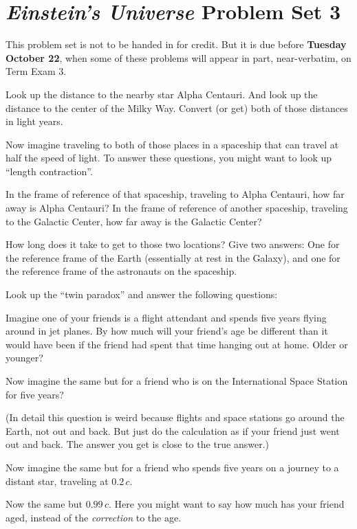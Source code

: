 \documentclass[12pt, letterpaper]{article}
\begin{document}
\section*{\textsl{Einstein's Universe} Problem Set 3}

This problem set is not to be handed in for credit. But it is due
before \textbf{Tuesday October 22}, when some of these problems
will appear in part, near-verbatim, on Term Exam 3.

\begin{problem}
Look up the distance to the nearby star Alpha Centauri. And look up the
distance to the center of the Milky Way. Convert (or get) both of those
distances in light years.

Now imagine traveling to both of those places in a spaceship that can
travel at half the speed of light. To answer these questions, you
might want to look up ``length contraction''.

In the frame of reference of that spaceship, traveling to Alpha
Centauri, how far away is Alpha Centauri? In the frame of reference of
another spaceship, traveling to the Galactic Center, how far away is
the Galactic Center?

How long does it take to get to those two locations? Give two answers:
One for the reference frame of the Earth (essentially at rest in the
Galaxy), and one for the reference frame of the astronauts on the
spaceship.
\end{problem}

\begin{problem}
Look up the ``twin paradox'' and answer the following questions:

Imagine one of your friends is a flight attendant and spends five years
flying around in jet planes. By how much will your friend's age be different
than it would have been if the friend had spent that time hanging out
at home. Older or younger?

Now imagine the same but for a friend who is on the International
Space Station for five years?

(In detail this question is weird because flights and space stations
go around the Earth, not out and back. But just do the calculation as
if your friend just went out and back. The answer you get is close to
the true answer.)

Now imagine the same but for a friend who spends five years on a journey
to a distant star, traveling at $0.2\,c$.

Now the same but $0.99\,c$. Here you might want to say how much has your
friend aged, instead of the \emph{correction} to the age.
\end{problem}
\end{document}
